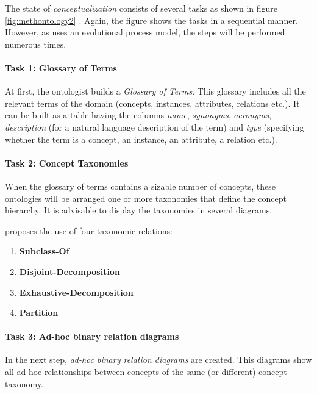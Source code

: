 The state of \emph{conceptualization} consists of several tasks as shown in figure \ref{fig:methontology2} \cite{MethontologyLegal}. Again, the figure shows the tasks in a sequential manner. However, as \methontology uses an evolutional process model, the steps will be performed numerous times.

\paragraph{Task 1: Glossary of Terms}

At first, the ontologist builds a \emph{Glossary of Terms}. This glossary includes all the relevant terms of the domain (concepts, instances, attributes, relations etc.). It can be built as a table having the columns \emph{name}, \emph{synonyms}, \emph{acronyms}, \emph{description} (for a natural language description of the term) and \emph{type} (specifying whether the term is a concept, an instance, an attribute, a relation etc.).

\paragraph{Task 2: Concept Taxonomies}

When the glossary of terms contains a sizable number of concepts, these ontologies will be arranged one or more taxonomies that define the concept hierarchy. It is advisable to display the taxonomies in several diagrams.

\methontology proposes the use of four taxonomic relations:
\begin{enumerate}
  \item \textbf{Subclass-Of}
  \item \textbf{Disjoint-Decomposition}
  \item \textbf{Exhaustive-Decomposition}
  \item \textbf{Partition}
\end{enumerate}


\paragraph{Task 3: Ad-hoc binary relation diagrams}

In the next step, \emph{ad-hoc binary relation diagrams} are created. This diagrams show all ad-hoc relationships between concepts of the same (or different) concept taxonomy.

